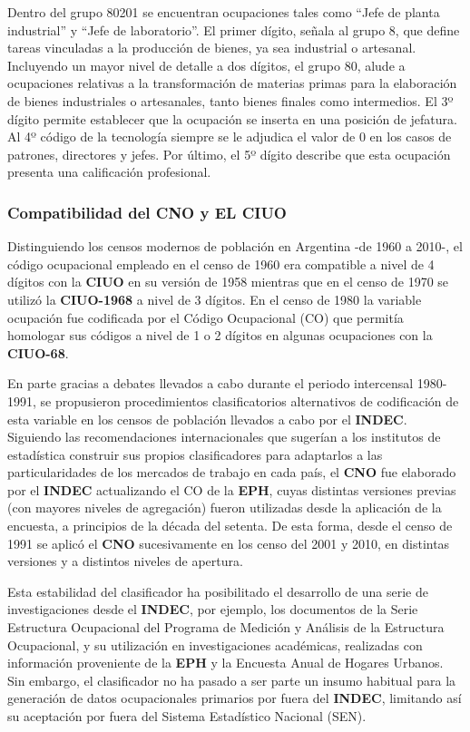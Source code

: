 \documentclass[
]{book}
\begin{document}
Dentro del grupo 80201 se encuentran ocupaciones tales como ``Jefe de planta industrial'' y ``Jefe de laboratorio''. El primer dígito, señala al grupo 8, que define tareas vinculadas a la producción de bienes, ya sea industrial o artesanal. Incluyendo un mayor nivel de detalle a dos dígitos, el grupo 80, alude a ocupaciones relativas a la transformación de materias primas para la elaboración de bienes industriales o artesanales, tanto bienes finales como intermedios. El 3º dígito permite establecer que la ocupación se inserta en una posición de jefatura. Al 4º código de la tecnología siempre se le adjudica el valor de 0 en los casos de patrones, directores y jefes. Por último, el 5º dígito describe que esta ocupación presenta una calificación profesional.

\hypertarget{compatibilidad-del-cno-y-el-ciuo}{%
\subsubsection{Compatibilidad del CNO y EL CIUO}\label{compatibilidad-del-cno-y-el-ciuo}}

Distinguiendo los censos modernos de población en Argentina -de 1960 a 2010-, el código ocupacional empleado en el censo de 1960 era compatible a nivel de 4 dígitos con la \textbf{CIUO} en su versión de 1958 mientras que en el censo de 1970 se utilizó la \textbf{CIUO-1968} a nivel de 3 dígitos. En el censo de 1980 la variable ocupación fue codificada por el Código Ocupacional (CO) que permitía homologar sus códigos a nivel de 1 o 2 dígitos en algunas ocupaciones con la \textbf{CIUO-68}.

En parte gracias a debates llevados a cabo durante el periodo intercensal 1980-1991, se propusieron procedimientos clasificatorios alternativos de codificación de esta variable en los censos de población llevados a cabo por el \textbf{INDEC}. Siguiendo las recomendaciones internacionales que sugerían a los institutos de estadística construir sus propios clasificadores para adaptarlos a las particularidades de los mercados de trabajo en cada país, el \textbf{CNO} fue elaborado por el \textbf{INDEC} actualizando el CO de la \textbf{EPH}, cuyas distintas versiones previas (con mayores niveles de agregación) fueron utilizadas desde la aplicación de la encuesta, a principios de la década del setenta. De esta forma, desde el censo de 1991 se aplicó el \textbf{CNO} sucesivamente en los censo del 2001 y 2010, en distintas versiones y a distintos niveles de apertura.

Esta estabilidad del clasificador ha posibilitado el desarrollo de una serie de investigaciones desde el \textbf{INDEC}, por ejemplo, los documentos de la Serie Estructura Ocupacional del Programa de Medición y Análisis de la Estructura Ocupacional, y su utilización en investigaciones académicas, realizadas con información proveniente de la \textbf{EPH} y la Encuesta Anual de Hogares Urbanos. Sin embargo, el clasificador no ha pasado a ser parte un insumo habitual para la generación de datos ocupacionales primarios por fuera del \textbf{INDEC}, limitando así su aceptación por fuera del Sistema Estadístico Nacional (SEN).
\end{document}
